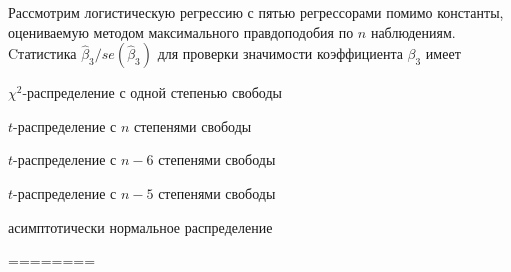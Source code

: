 
\begin{question}
Рассмотрим логистическую регрессию с пятью регрессорами помимо
константы, оцениваемую методом максимального правдоподобия по \(n\)
наблюдениям. Cтатистика \(\hat \beta_3 / se(\hat\beta_3)\) для проверки
значимости коэффициента \(\beta_3\) имеет
\begin{answerlist}
  \item \(\chi^2\)-распределение с одной степенью свободы
  \item \(t\)-распределение с \(n\) степенями свободы
  \item \(t\)-распределение с \(n-6\) степенями свободы
  \item \(t\)-распределение с \(n-5\) степенями свободы
  \item асимптотически нормальное распределение
\end{answerlist}
\end{question}

\begin{solution}
========
\end{solution}

